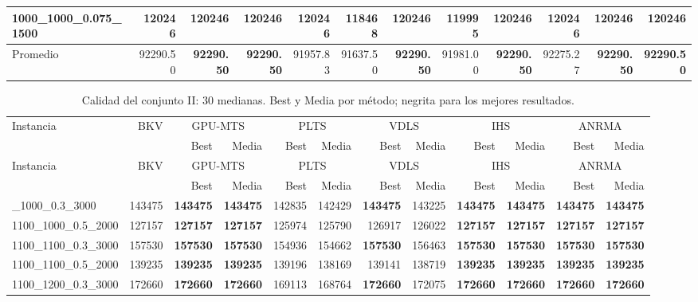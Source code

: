 \begin{landscape}
\begin{longtable}{lrrrrrrrrrrr}
1000\_1000\_0.075\_1500 & 120246 & \textbf{120246} & \textbf{120246} & \textbf{120246} & 118468 & \textbf{120246} & 119995 & \textbf{120246} & \textbf{120246} & \textbf{120246} & \textbf{120246}\\
\midrule
Promedio & 92290.50 & \textbf{92290.50} & \textbf{92290.50} & 91957.83 & 91637.50 & \textbf{92290.50} & 91981.00 & \textbf{92290.50} & 92275.27 & \textbf{92290.50} & \textbf{92290.50}\\
\end{longtable}\endgroup\clearpage
\begingroup\footnotesize\setlength{\tabcolsep}{2.5pt}\renewcommand{\arraystretch}{.88}
\begin{longtable}{lrrrrrrrrrrr}
\caption{{Calidad del conjunto II: 30 medianas. Best y Media por método; negrita para los mejores resultados.}}\label{tab:full-c2}\\
\toprule
Instancia & BKV & \multicolumn{2}{c}{GPU-MTS} & \multicolumn{2}{c}{PLTS} & \multicolumn{2}{c}{VDLS} & \multicolumn{2}{c}{IHS} & \multicolumn{2}{c}{ANRMA}\\
 &  & Best & Media & Best & Media & Best & Media & Best & Media & Best & Media\\
\midrule\endfirsthead
Instancia & BKV & \multicolumn{2}{c}{GPU-MTS} & \multicolumn{2}{c}{PLTS} & \multicolumn{2}{c}{VDLS} & \multicolumn{2}{c}{IHS} & \multicolumn{2}{c}{ANRMA}\\
 &  & Best & Media & Best & Media & Best & Media & Best & Media & Best & Media\\
\midrule\endhead
\bottomrule\endlastfoot
1100\_1000\_0.3\_3000 & 143475 & \textbf{143475} & \textbf{143475} & 142835 & 142429 & \textbf{143475} & 143225 & \textbf{143475} & \textbf{143475} & \textbf{143475} & \textbf{143475}\\
1100\_1000\_0.5\_2000 & 127157 & \textbf{127157} & \textbf{127157} & 125974 & 125790 & 126917 & 126022 & \textbf{127157} & \textbf{127157} & \textbf{127157} & \textbf{127157}\\
1100\_1100\_0.3\_3000 & 157530 & \textbf{157530} & \textbf{157530} & 154936 & 154662 & \textbf{157530} & 156463 & \textbf{157530} & \textbf{157530} & \textbf{157530} & \textbf{157530}\\
1100\_1100\_0.5\_2000 & 139235 & \textbf{139235} & \textbf{139235} & 139196 & 138169 & 139141 & 138719 & \textbf{139235} & \textbf{139235} & \textbf{139235} & \textbf{139235}\\
1100\_1200\_0.3\_3000 & 172660 & \textbf{172660} & \textbf{172660} & 169113 & 168764 & \textbf{172660} & 172075 & \textbf{172660} & \textbf{172660} & \textbf{172660} & \textbf{172660}\\

\end{longtable}
\end{landscape}
